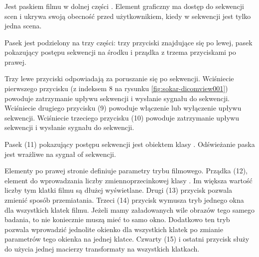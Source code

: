 \subsubsection{}
\label{sec:sokar-dicomtoolbar}


\subsubsection{}
\label{sec:sokar-dicomgraphics}

\subsubsection{}
\label{sec:sokar-moviebar}

\par
Jest paskiem filmu w dolnej części .
Element graficzny ma dostęp do sekwencji scen i ukrywa swoją obecność przed użytkownikiem, kiedy w sekwencji jest tylko jedna scena.

\par
Pasek jest podzielony na trzy części: trzy przyciski znajdujące się po lewej, pasek pokazujący postępu sekwencji na środku i prządka z trzema przyciskami po prawej.

\par
Trzy lewe przyciski odpowiadają za poruszanie się po sekwencji.
Wciśniecie pierwszego przycisku (z indeksem 8 na rysunku \ref{fig:sokar-dicomview001}) powoduje zatrzymanie upływu sekwencji i wysłanie sygnału  do sekwencji.
Wciśniecie drugiego przycisku (9) powoduje włączenie lub wyłączenie upływu sekwencji.
Wciśniecie trzeciego przycisku (10) powoduje zatrzymanie upływu sekwencji i wysłanie sygnału  do sekwencji.
\par
Pasek (11) pokazujący postępu sekwencji jest obiektem klasy .
Odświeżanie paska jest wrażliwe na sygnał  of sekwencji.
\par
Elementy po prawej stronie definiuje parametry trybu filmowego.
Prządka (12), element do wprowadzania liczby zmiennoprzecinkowej klasy .
Im większa wartość liczby tym klatki filmu są dłużej wyświetlane.
Drugi (13) przycisk pozwala zmienić sposób przemiatania.
Trzeci (14) przycisk wymusza tryb jednego okna dla wszystkich klatek filmu.
Jeżeli mamy załadowanych wile obrazów tego samego badania, to nie koniecznie muszą mieć to samo okno.
Dodatkowo ten tryb pozwala wprowadzić jednolite okienko dla wszystkich klatek po zmianie parametrów tego okienka na jednej klatce.
Czwarty (15) i ostatni przycisk służy do użycia jednej macierzy transformaty na wszystkich klatkach.

